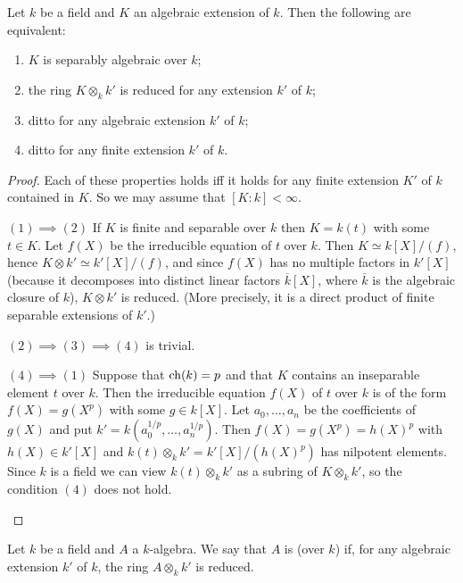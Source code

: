 \documentclass[../main]{subfiles}
\begin{document}
\begin{parlemma}
\label{lem:27.1}
Let $k$ be a field and $K$ an algebraic extension of $k$. Then the following are equivalent: 

\begin{enumerate}[label= (\arabic*)]
    \item $K$ is separably algebraic over $k$;
    \item the ring $K \otimes_k k'$ is reduced for any extension $k'$ of $k$;
    \item ditto for any algebraic extension $k'$ of $k$;
    \item ditto for any finite extension $k'$ of $k$. 
\end{enumerate}
\end{parlemma}

\begin{proof}
Each of these properties holds iff it holds for any finite extension $K'$ of $k$ contained in $K$. So we may assume that $[K : k] < \infty$.
\begin{implyenumerate}
    \item[$(1) \implies (2)$] If $K$ is finite and separable over $k$ then $K = k(t)$ with some $t \in K$. Let $f(X)$ be the irreducible equation of $t$ over $k$. Then $K \simeq k[X]/(f)$, hence $K \otimes k' \simeq k'[X]/(f)$, and since $f(X)$ has no multiple factors in $k'[X]$ (because it decomposes into distinct linear factors ${\overline k}[X]$, where $\overline k$ is the algebraic closure of $k$), $K \otimes k'$ is reduced. (More precisely, it is a direct product of finite separable extensions of $k'$.)
    \item[$(2) \implies (3)\implies (4)$] is trivial.
    \item[$(4) \implies (1)$] Suppose that $\operatorname{ch}(k) = p$ and that $K$ contains an inseparable element $t$ over $k$. Then the irreducible equation $f(X)$ of $t$ over $k$ is of the form $f(X) = g(X^p)$ with some $g \in k[X]$. Let $a_0, \ldots, a_n$ be the coefficients of $g(X)$ and put $k' = k(a_0^{1/p}, \ldots, a_n^{1/p})$. Then $f(X) = g(X^p) = h(X)^p$ with $h(X) \in k'[X]$ and $k(t) \otimes_k k' = k'[X]/(h(X)^p)$ has nilpotent elements. Since $k$ is a field we can view $k(t) \otimes_k k'$ as a subring of $K \otimes_k k'$, so the condition $(4)$ does not hold.  
\end{implyenumerate}
\end{proof}

\begin{pardefinition}
Let $k$ be a field and $A$ a $k$-algebra. We say that $A$ is  (over $k$) if, for any algebraic extension $k'$ of $k$, the ring $A \otimes_k k'$ is reduced.
\end{pardefinition}
\end{document}
